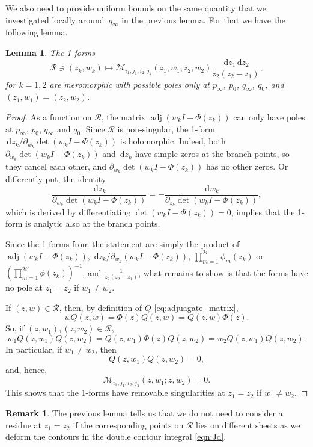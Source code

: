 \documentclass[11pt]{article}
\theoremstyle{plain}
\newtheorem{lemma}[theorem]{Lemma}
\theoremstyle{definition}
\newtheorem{remark}[theorem]{Remark}
\numberwithin{equation}{section}
\renewcommand{\d}{\,\mathrm{d}}
\DeclareMathOperator{\adj}{adj}
\begin{document}
We also need to provide uniform bounds on the same quantity that we investigated locally around~$q_\infty$ in the previous lemma. For that we have the following lemma.
%
\begin{lemma} \label{lem:global_matrix_meromorphicity}
The 1-forms
%
\begin{equation}
\mathcal R\ni (z_k,w_k)\mapsto \boldsymbol{\mathcal{M}}_{i_1,j_1,i_2,j_2}\left(z_1,w_1;z_2,w_2\right) \frac{\d z_1 \d z_2}{z_2(z_2-z_1)}, 
\end{equation}
for $k=1,2$ are meromorphic with possible poles only at $p_\infty$, $p_0$, $q_\infty$, $q_0$, and $(z_1,w_1)=(z_2,w_2)$. 
\end{lemma}
\begin{proof}
As a function on $\mathcal R$, the matrix $\adj(w_kI-\Phi(z_k))$ can only have poles at $p_\infty$, $p_0$, $q_\infty$ and $q_0$. Since $\mathcal R$ is non-singular, the 1-form $\d z_k/\partial_{w_k}\det(w_kI-\Phi(z_k))$ is holomorphic. Indeed, both $\partial_{w_k}\det(w_kI-\Phi(z_k))$ and $\d z_k$ have simple zeros at the branch points, so they cancel each other, and $\partial_{w_k}\det(w_kI-\Phi(z_k))$ has no other zeros. Or differently put, the identity
\begin{equation}
\frac{\d z_k}{\partial_{w_k}\det (w_kI-\Phi(z_k))}=-\frac{\d w_k}{\partial_{z_k}\det (w_kI-\Phi(z_k))},
\end{equation}
which is derived by differentiating $\det(w_kI-\Phi(z_k))=0$, implies that the 1-form is analytic also at the branch points. 

Since the 1-forms from the statement are simply the product of $\adj(w_kI-\Phi(z_k))$, $\d z_k/\partial_{w_k}(w_kI-\Phi(z_k))$, $\prod_{m=1}^{2i}\phi_m(z_k)$ or $\left(\prod_{m=1}^{2i'}\phi(z_k)\right)^{-1}$, and $\frac{1}{z_2(z_2-z_1)}$, what remains to show is that the forms have no pole at $z_1=z_2$ if $w_1\neq w_2$. 

If $(z,w)\in \mathcal R$, then, by definition of $Q$ \eqref{eq:adjuagate_matrix}, 
\begin{equation}
wQ(z,w)=\Phi(z)Q(z,w)=Q(z,w)\Phi(z).
\end{equation}
So, if $(z,w_1), (z,w_2)\in \mathcal R$, 
\begin{equation}
w_1Q(z,w_1)Q(z,w_2)=Q(z,w_1)\Phi(z)Q(z,w_2)=w_2Q(z,w_1)Q(z,w_2).
\end{equation}
In particular, if $w_1\neq w_2$, then
\begin{equation}
Q(z,w_1)Q(z,w_2)=0,
\end{equation}
and, hence,
\begin{equation}
\mathcal M_{i_1,j_1,i_2,j_2}(z,w_1;z,w_2)=0.
\end{equation} 
This shows that the 1-forms have removable singularities at $z_1=z_2$ if $w_1\neq w_2$.
\end{proof}
\begin{remark}
The previous lemma tells us that we do not need to consider a residue at $z_1=z_2$ if the corresponding points on $\mathcal R$ lies on different sheets as we deform the contours in the double contour integral \eqref{eqn:Jd}. 
\end{remark}
\end{document}
